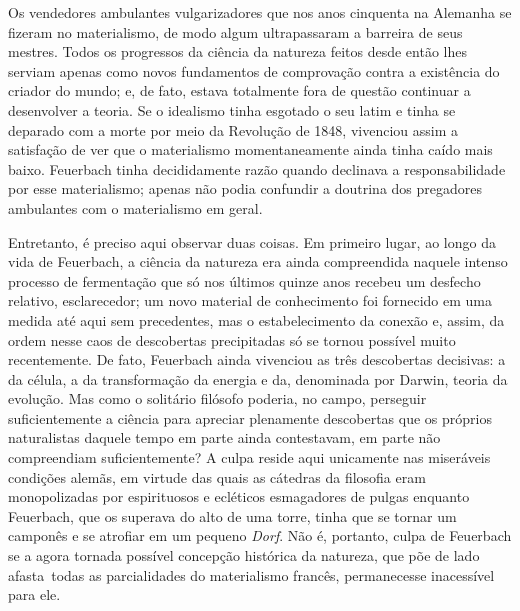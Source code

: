 Os vendedores ambulantes vulgarizadores que nos anos cinquenta na %
Alemanha se fizeram no materialismo, de modo algum ultrapassaram a
barreira de seus mestres. Todos os progressos da ciência da natureza
feitos desde então lhes serviam apenas como novos fundamentos de
comprovação contra a existência do criador do mundo; e, de fato, estava
totalmente fora de questão continuar a desenvolver a teoria. Se o
idealismo tinha esgotado o seu latim e tinha se deparado com a morte por %
meio da Revolução de 1848, vivenciou assim a satisfação de ver que o
materialismo momentaneamente ainda tinha caído mais %
baixo. Feuerbach tinha
decididamente razão quando declinava a responsabilidade por esse
materialismo; apenas não podia confundir a doutrina dos pregadores %
ambulantes com o materialismo em geral.

Entretanto, é preciso aqui observar duas coisas. Em primeiro lugar, ao
longo da vida
de Feuerbach,
a ciência da natureza era ainda compreendida naquele intenso processo de
fermentação que só nos últimos quinze anos recebeu um desfecho relativo, %
esclarecedor; um novo material de conhecimento foi fornecido em uma
medida até aqui sem precedentes, mas o estabelecimento
da conexão e, assim, da ordem nesse caos de 
descobertas precipitadas só se tornou possível muito recentemente. De
fato,
 Feuerbach ainda
vivenciou as três descobertas decisivas: a da célula, a da
transformação da energia e da, denominada %
por Darwin,
teoria da evolução. Mas como o solitário
filósofo poderia, no campo, perseguir suficientemente a ciência para %
apreciar plenamente descobertas que os próprios naturalistas daquele
tempo em parte ainda contestavam, em parte não compreendiam %
suficientemente? A culpa reside aqui unicamente nas miseráveis condições
alemãs, em virtude das quais as cátedras da filosofia eram monopolizadas %
por espirituosos e ecléticos esmagadores de pulgas
enquanto Feuerbach,
que os superava do alto de uma torre, tinha que se tornar um camponês e
se atrofiar em um pequeno \emph{Dorf}. Não é, portanto, culpa %
de Feuerbach
se a agora tornada possível concepção histórica da natureza, que põe de %
lado \textbar{}\,afasta\,\textbar{} todas as parcialidades do materialismo francês,
permanecesse inacessível para ele.

